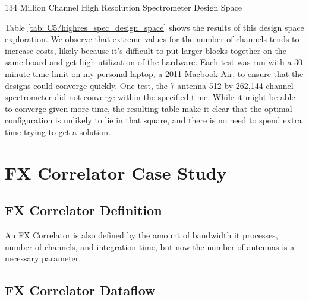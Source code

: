 \begin{table}

\caption{134 Million Channel High Resolution Spectrometer Design Space}
\label{tab: C5/highres_spec_design_space}
\end{table} 

%

Table \ref{tab: C5/highres_spec_design_space} shows the results of this design space exploration. 
We observe that extreme values for the number of channels tends to increase costs, likely because it's difficult to put larger blocks together on the same board and get high utilization of the hardware.
Each test was run with a 30 minute time limit on my personal laptop, a 2011 Macbook Air, to ensure that the designs could converge quickly.
One test, the 7 antenna 512 by 262,144 channel spectrometer did not converge within the specified time.
While it might be able to converge given more time, the resulting table make it clear that the optimal configuration is unlikely to lie in that square, and there is no need to spend extra time trying to get a solution.









\section{FX Correlator Case Study}
\subsection{FX Correlator Definition}
An FX Correlator is also defined by the amount of bandwidth it processes, number of channels, and integration time, but now the number of antennas is a necessary parameter.

\subsection{FX Correlator Dataflow}

